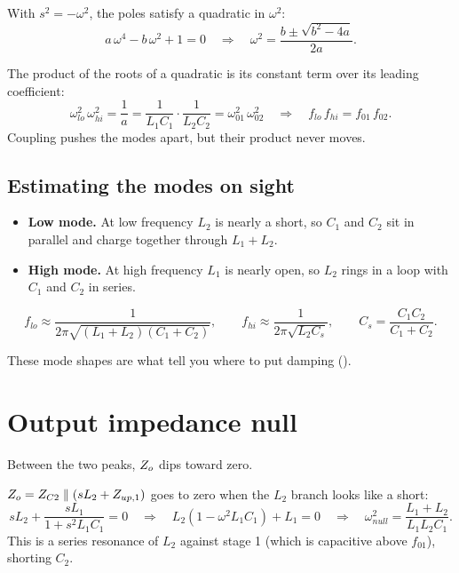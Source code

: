 With $s^2 = -\omega^2$, the poles satisfy a quadratic in $\omega^2$:
\begin{equation}\label{eq:modes}
	a\,\omega^4 - b\,\omega^2 + 1 = 0
	\quad\Rightarrow\quad
	\omega^2 = \frac{b \pm \sqrt{b^2 - 4a}}{2a}.
\end{equation}

\begin{derivation}
	The product of the roots of a quadratic is its constant term over its
	leading coefficient:
	\[
		\omega_{lo}^2\,\omega_{hi}^2 = \frac{1}{a} = \frac{1}{L_1C_1}\cdot\frac{1}{L_2C_2} = \omega_{01}^2\,\omega_{02}^2
		\quad\Rightarrow\quad
		f_{lo}\,f_{hi} = f_{01}\,f_{02}.
	\]
	Coupling pushes the modes apart, but their product never moves.
\end{derivation}

\subsection{Estimating the modes on sight}

\begin{itemize}
	\item \textbf{Low mode.} At low frequency $L_2$ is nearly a short, so $C_1$
	      and $C_2$ sit in parallel and charge together through $L_1 + L_2$.
	\item \textbf{High mode.} At high frequency $L_1$ is nearly open, so $L_2$
	      rings in a loop with $C_1$ and $C_2$ in series.
\end{itemize}
\begin{equation}\label{eq:mode-estimates}
	f_{lo} \approx \frac{1}{2\pi\sqrt{(L_1 + L_2)(C_1 + C_2)}}, \qquad
	f_{hi} \approx \frac{1}{2\pi\sqrt{L_2 C_s}}, \qquad
	C_s = \frac{C_1C_2}{C_1 + C_2}.
\end{equation}

These mode shapes are what tell you where to put damping ().

\section{Output impedance null}

Between the two peaks, $Z_o$ dips toward zero.

\begin{derivation}
	$Z_o = Z_{C2} \parallel (sL_2 + Z_{up,1})$ goes to zero when the $L_2$
	branch looks like a short:
	\[
		sL_2 + \frac{sL_1}{1 + s^2L_1C_1} = 0
		\quad\Rightarrow\quad
		L_2(1 - \omega^2L_1C_1) + L_1 = 0
		\quad\Rightarrow\quad
		\omega_{null}^2 = \frac{L_1 + L_2}{L_1L_2C_1}.
	\]
	This is a series resonance of $L_2$ against stage 1 (which is capacitive
	above $f_{01}$), shorting $C_2$.
\end{derivation}

